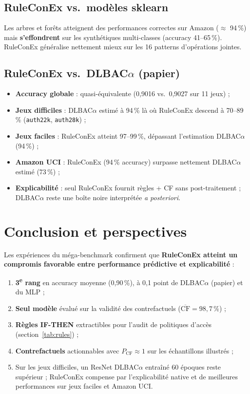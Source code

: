\documentclass[11pt,a4paper]{article}
\begin{document}
\subsection{RuleConEx vs.\ modèles sklearn}

Les arbres et forêts atteignent des performances correctes sur Amazon ($\approx$ 94\,\%) mais \textbf{s'effondrent} sur les synthétiques multi-classes (accuracy 41--65\,\%). RuleConEx généralise nettement mieux sur les 16 patterns d'opérations jointes.

\subsection{RuleConEx vs.\ DLBAC$\alpha$ (papier)}

\begin{itemize}
  \item \textbf{Accuracy globale} : quasi-équivalente (0,9016 vs.\ 0,9027 sur 11 jeux) ;
  \item \textbf{Jeux difficiles} : DLBAC$\alpha$ estimé à 94\,\% là où RuleConEx descend à 70--89\,\% (\texttt{auth22k}, \texttt{auth28k}) ;
  \item \textbf{Jeux faciles} : RuleConEx atteint 97--99\,\%, dépassant l'estimation DLBAC$\alpha$ (94\,\%) ;
  \item \textbf{Amazon UCI} : RuleConEx (94\,\% accuracy) surpasse nettement DLBAC$\alpha$ estimé (73\,\%) ;
  \item \textbf{Explicabilité} : seul RuleConEx fournit règles + CF sans post-traitement ; DLBAC$\alpha$ reste une boîte noire interprétée \emph{a posteriori}.
\end{itemize}

\section{Conclusion et perspectives}

Les expériences du méga-benchmark confirment que \textbf{RuleConEx atteint un compromis favorable entre performance prédictive et explicabilité} :

\begin{enumerate}
  \item \textbf{3\textsuperscript{e} rang} en accuracy moyenne (0,90\,\%), à 0,1 point de DLBAC$\alpha$ (papier) et du MLP ;
  \item \textbf{Seul modèle} évalué sur la validité des contrefactuels ($\overline{\mathrm{CF}} = 98{,}7\,\%$) ;
  \item \textbf{Règles IF-THEN} extractibles pour l'audit de politiques d'accès (section~\ref{tab:rules}) ;
  \item \textbf{Contrefactuels} actionnables avec $P_{\mathrm{CF}} \approx 1$ sur les échantillons illustrés ;
  \item Sur les jeux difficiles, un ResNet DLBAC$\alpha$ entraîné 60 époques reste supérieur ; RuleConEx compense par l'explicabilité native et de meilleures performances sur jeux faciles et Amazon UCI.
\end{enumerate}
\end{document}
